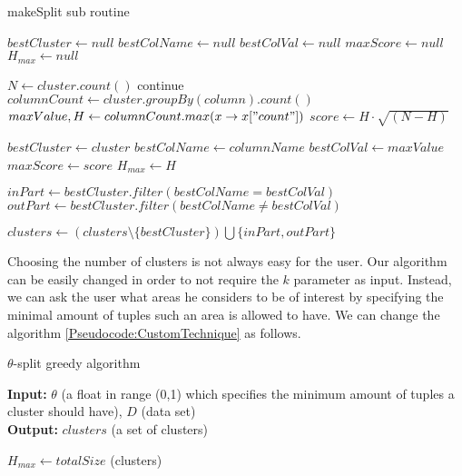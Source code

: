 \begin{algorithm}
{\fontsize{8.2pt}{10pt}\selectfont
\caption{makeSplit sub routine}
\label{procedure:makeSplit}
\begin{algorithmic}[1]
    \State $bestCluster \gets  null$
    \State $bestColName \gets null$
    \State $bestColVal \gets null$
    \State $maxScore \gets null$
    \State $H_{max} \gets null$
    
        \State $N \gets cluster.count()$
            \State continue
        \EndIf
            \State $columnCount \gets cluster.groupBy(column).count()$
            \State $maxValue, H \gets columnCount.max(x \rightarrow x["count"])$
            \State $score \gets H \cdot \sqrt{(N-H)}$
            
                \State $bestCluster \gets cluster$
                \State $bestColName \gets columnName$
                \State $bestColVal \gets maxValue$
                \State $maxScore \gets score$
                \State $H_{max} \gets H$
            \EndIf
        \EndFor
    \EndFor
    
    \State $inPart \gets bestCluster.filter(bestColName = bestColVal)$
    \State $outPart \gets bestCluster.filter(bestColName \neq bestColVal)$
    
    \State $clusters \gets (clusters \setminus \{bestCluster\}) \bigcup \{inPart, outPart\}$
    
    \EndProcedure
\end{algorithmic}
}
\end{algorithm}


Choosing the number of clusters is not always easy for the user. Our algorithm can be easily changed in order to not require the $k$ parameter as input. Instead, we can ask the user what areas he considers to be of interest by specifying the minimal amount of tuples such an area is allowed to have. We can change the algorithm \ref{Pseudocode:CustomTechnique} as follows.
\begin{algorithm}
{\fontsize{8.2pt}{10pt}\selectfont
\caption{$\theta$-split greedy algorithm}
\label{Pseudocode:CustomTechnique2}
\hspace*{\algorithmicindent} \textbf{Input:} $\theta$ (a float in range (0,1) which specifies the minimum amount of tuples a cluster should have), $D$ (data set) \\
\hspace*{\algorithmicindent} \textbf{Output:} $clusters$ (a set of clusters)
\begin{algorithmic}[1]
     \State $H_{max} \gets totalSize$
        \State {}(clusters)
     \EndWhile
\end{algorithmic}
}
\end{algorithm}
